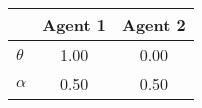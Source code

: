 \begin{tiny}\begin{tabular}{|l|c|c|}
\hline
&\textbf{Agent 1}&\textbf{Agent 2}\\\hline
\textbf{$\theta$}&1.00&0.00\\\hline
\textbf{$\alpha$}&0.50&0.50\\\hline
\end{tabular}
\end{tiny}